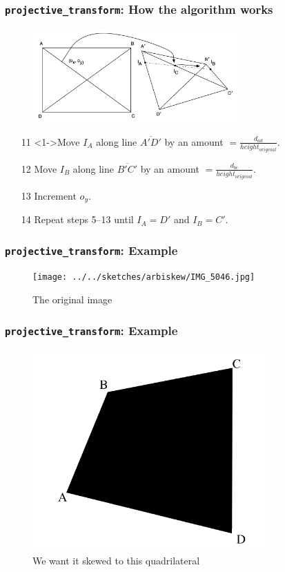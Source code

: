 \documentclass{beamer}
\begin{document}
\begin{frame}
	\frametitle{{\tt projective\_transform}: How the algorithm works}
	\begin{figure}
		\centering
		\includegraphics[width=0.7\textwidth]{images/arbiskew_graphic_with_iterators3.png}
	\end{figure}
	\begin{enumerate}
	\item[11] <1->Move $I_A$ along line $\overline{A\prime D\prime}$ by an amount $= \frac{d_{ad}}{height_{original}}$.
	\item[12] Move $I_B$ along line $\overline{B\prime C\prime}$ by an amount $= \frac{d_{bc}}{height_{original}}$.
	\item[13] Increment $o_y$.
	\item[14] Repeat steps 5--13 until $I_A = D\prime$ and $I_B = C\prime$.
	\end{enumerate}
\end{frame}

\begin{frame}
	\frametitle{{\tt projective\_transform}: Example}
	\begin{figure}
		\centering
		\texttt{[image: ../../sketches/arbiskew/IMG\_5046.jpg]}
		\caption{The original image}
	\end{figure}
\end{frame}

\begin{frame}
	\frametitle{{\tt projective\_transform}: Example}
	\begin{figure}
		\centering
		\includegraphics[width=0.8\textwidth]{images/skew_example/skew_rectangle.png}
		\caption{We want it skewed to this quadrilateral}
	\end{figure}
\end{frame}
\end{document}
